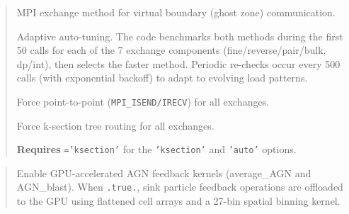 \begin{quote}
MPI exchange method for virtual boundary (ghost zone) communication.
\begin{description}[style=nextline,leftmargin=2.5cm,font=\ttfamily]
  \item[`auto'] Adaptive auto-tuning.  The code benchmarks both methods
    during the first 50 calls for each of the 7 exchange components
    (fine/reverse/pair/bulk, dp/int), then selects the faster method.
    Periodic re-checks occur every 500 calls (with exponential backoff)
    to adapt to evolving load patterns.
  \item[`p2p'] Force point-to-point (\texttt{MPI\_ISEND/IRECV}) for all
    exchanges.
  \item[`ksection'] Force k-section tree routing for all exchanges.
\end{description}

\textbf{Requires} \texttt{='ksection'} for the
\texttt{'ksection'} and \texttt{'auto'} options.

\end{quote}

\label{param:gpu_sink}

\begin{quote}
Enable GPU-accelerated AGN feedback kernels (average\_AGN and
AGN\_blast).  When \texttt{.true.}, sink particle feedback operations
are offloaded to the GPU using flattened cell arrays and a 27-bin
spatial binning kernel.

\end{quote}

\label{param:mem_weight_sink}


